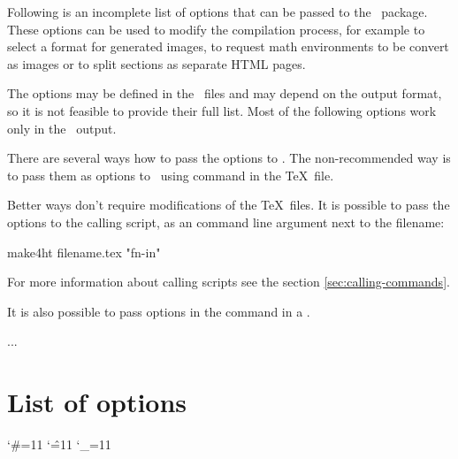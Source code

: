 


Following is an incomplete list of options that can be passed to the \fourhtsty\ package.
These options can be used to modify the compilation process, for example to
select a  format for generated images, to request math environments
to be convert as images or to split sections as separate HTML pages. 

The options may be defined in the \fourhtfile\ files and may depend on the
output format, so it is not feasible to provide their full list. Most of the
following options work only in the \HTML\ output.

There are several ways how to pass the options to \texfourht. The
non-recommended way is to pass them as options to \fourhtsty\ using
\texcommand{\usepackage} command in the \TeX\ file. 

Better ways don't require modifications of the \TeX\ files.
It is possible to pass the options to the calling script, as an command line
argument next to the filename:

\begin{shellcommand}
make4ht filename.tex "fn-in"
\end{shellcommand}

For more information about calling scripts see the section \ref{sec:calling-commands}.

It is also possible to pass options in the \texcommand{\Preamble} command in a \cfgfile.

\begin{texsource}
...

\EndPreamble
\end{texsource}



\section{List of options}
\label{sec:texfouhtoptions}

\begingroup
\catcode`\#=11 \catcode`\^=11 \catcode`\_=11


